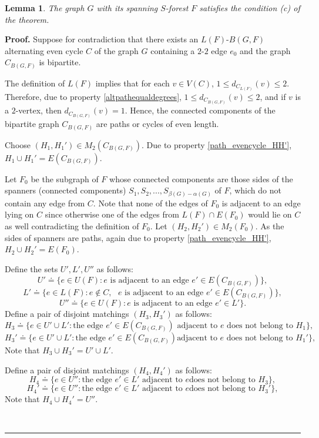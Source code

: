 \documentclass[a4paper, 12pt]{article}
\newtheorem{lemma}{Lemma}[subsection]
\newenvironment{proof}[1][Proof]{\noindent\textbf{#1.} }{\ \rule{0.5em}{0.5em}}
\begin{document}
\begin{lemma} \label{condition3}
The graph $G$ with its spanning $S$-forest $F$ satisfies the
condition (c) of the theorem.
\end{lemma}
\begin{proof}
Suppose for contradiction that there exists an $L(F)$-$B(G,F)$
alternating even cycle $C$ of the graph $G$ containing a $2$-$2$
edge $e_0$ and the graph $C_{B(G,F)}$ is bipartite.

The definition of $L(F)$ implies that for each $v \in V(C)$, $1 \leq
d_{C_{L(F)}}(v) \leq 2$. Therefore, due to property
\ref{altpathequaldegrees}, $1 \leq d_{C_{B(G,F)}}(v) \leq 2$, and if
$v$ is a $2$-vertex, then $d_{C_{B(G,F)}}(v) = 1$. Hence, the
connected components of the bipartite graph $C_{B(G,F)}$ are paths
or cycles of even length.

Choose $(H_1,H_1') \in M_2(C_{B(G,F)})$. Due to property
\ref{path_evencycle_HH'}, $H_1 \cup H_1' = E(C_{B(G,F)})$.

Let $F_0$ be the subgraph of $F$ whose connected components are
those sides of the spanners (connected components) $S_1, S_2, ...,
S_{\beta(G) - \alpha(G)}$ of $F$, which do not contain any edge from
$C$. Note that none of the edges of $F_0$ is adjacent to an edge
lying on $C$ since otherwise one of the edges from $L(F) \cap
E(F_0)$ would lie on $C$ as well contradicting the definition of
$F_0$. Let $(H_2, H_2') \in M_2(F_0)$. As the sides of spanners are
paths, again due to property \ref{path_evencycle_HH'}, $H_2 \cup
H_2' = E(F_0)$.

Define the sets $U', L', U''$ as follows:
$$U' \doteq \{ e \in U(F) : e \text{ is adjacent to an edge } e' \in E(C_{B(G,F)}) \},$$
$$L' \doteq \{ e \in L(F) : e \notin C, \text{ $e$ is adjacent to an edge } e'
\in E(C_{B(G,F)}) \},$$
$$U'' \doteq \{ e \in U(F) : \text{$e$ is adjacent to an edge } e' \in L' \}.$$
Define a pair of disjoint matchings $(H_3,H_3')$ as follows:
$$H_3 \doteq \{ e \in U' \cup L' : \text{the edge $e' \in E(C_{B(G,F)})$ adjacent
to $e$ does not belong to } H_1 \},$$
$$H_3' \doteq \{ e \in U' \cup L' : \text{the edge $e' \in E(C_{B(G,F)})$
adjacent to $e$ does not belong to } H_1' \},$$ Note that $H_3 \cup
H_3' = U' \cup L'$.

Define a pair of disjoint matchings $(H_4,H_4')$ as follows:
$$H_4 \doteq \{ e \in U'' : \text{the edge $e' \in L'$ adjacent to $e$
does not belong to } H_3 \},$$
$$H_4' \doteq \{ e \in U'' : \text{the edge $e' \in L'$ adjacent to $e$
does not belong to } H_3' \},$$ Note that $H_4 \cup H_4' = U''$.


\end{proof}
\end{document}
